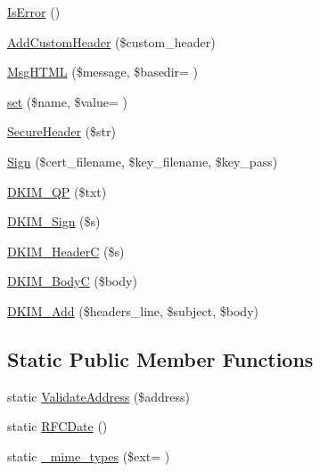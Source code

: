 \begin{DoxyCompactItemize}
\hyperlink{class_p_h_p_mailer_a0e891e2bb244521ac9603655ea200344}{Is\+Error} ()
\item 
\hyperlink{class_p_h_p_mailer_ac19ac63641c11a8eb58ad11dbf47e156}{Add\+Custom\+Header} (\$custom\+\_\+header)
\item 
\hyperlink{class_p_h_p_mailer_ac48137ee3d7661e9566704ed98300408}{Msg\+H\+T\+M\+L} (\$message, \$basedir= \textquotesingle{}\textquotesingle{})
\item 
\hyperlink{class_p_h_p_mailer_a75ddddcb4fd8f092e42a3cf96c006066}{set} (\$name, \$value= \textquotesingle{}\textquotesingle{})
\item 
\hyperlink{class_p_h_p_mailer_aafff860e0a31e849f41353b2e33758fa}{Secure\+Header} (\$str)
\item 
\hyperlink{class_p_h_p_mailer_a82ff37bac7012438250588672d3c0ff5}{Sign} (\$cert\+\_\+filename, \$key\+\_\+filename, \$key\+\_\+pass)
\item 
\hyperlink{class_p_h_p_mailer_acec5422fbacb7c17671e613d5a3c6c47}{D\+K\+I\+M\+\_\+\+Q\+P} (\$txt)
\item 
\hyperlink{class_p_h_p_mailer_a462f91ee500a3e937258a8db0ab67c3c}{D\+K\+I\+M\+\_\+\+Sign} (\$s)
\item 
\hyperlink{class_p_h_p_mailer_a38042224558475fb77972edfe9979c0d}{D\+K\+I\+M\+\_\+\+Header\+C} (\$s)
\item 
\hyperlink{class_p_h_p_mailer_a59e764f699f678a6fa52ee089e941b1b}{D\+K\+I\+M\+\_\+\+Body\+C} (\$body)
\item 
\hyperlink{class_p_h_p_mailer_a3d464b41f5f853bb29c83d8e74fe1470}{D\+K\+I\+M\+\_\+\+Add} (\$headers\+\_\+line, \$subject, \$body)
\end{DoxyCompactItemize}
\subsection*{Static Public Member Functions}
\begin{DoxyCompactItemize}
\item 
static \hyperlink{class_p_h_p_mailer_af4b27cbe4e11a02887a7f3a326aab1ef}{Validate\+Address} (\$address)
\item 
static \hyperlink{class_p_h_p_mailer_afe3d1a505bfbde7a79256042a8a43057}{R\+F\+C\+Date} ()
\item 
static \hyperlink{class_p_h_p_mailer_add7b3e7830b61950b7a201f2d432289f}{\+\_\+mime\+\_\+types} (\$ext= \textquotesingle{}\textquotesingle{})
\end{DoxyCompactItemize}
